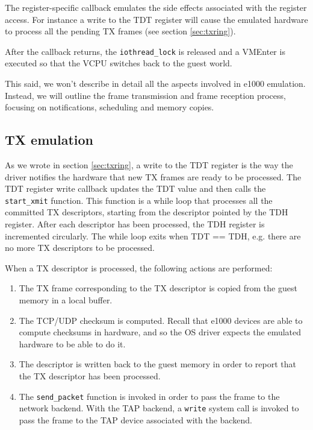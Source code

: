 The register-specific callback emulates the side effects associated with the register access. For instance a write to the TDT
register will cause the emulated hardware to process all the pending TX frames (see section \ref{sec:txring}).

After the callback returns, the \texttt{iothread\_lock} is released and a VMEnter is executed so that the VCPU switches back to the 
guest world.

\vspace{0.5cm}

This said, we won't describe in detail all the aspects involved in e1000 emulation. Instead, we will outline the frame
transmission and frame reception process, focusing on notifications, scheduling and memory copies.


\subsection{TX emulation}
As we wrote in section \ref{sec:txring}, a write to the TDT register is the way the driver notifies the hardware that new TX frames 
are ready to be processed.
The TDT register write callback updates the TDT value and then calls the \texttt{start\_xmit} function. This function is a while
loop that processes all the committed TX descriptors, starting from the descriptor pointed by the TDH register. After each
descriptor has been processed, the TDH register is incremented circularly. The while loop exits when TDT == TDH, e.g. there
are no more TX descriptors to be processed.

When a TX descriptor is processed, the following actions are performed:
\begin{enumerate}
    \item The TX frame corresponding to the TX descriptor is copied from the guest memory in a local buffer.
    \item The TCP/UDP checksum is computed. Recall that e1000 devices are able to compute checksums in hardware, and so the OS 
	  driver expects the emulated hardware to be able to do it.
    \item The descriptor is written back to the guest memory in order to report that the TX descriptor has been processed.
    \item The \texttt{send\_packet} function is invoked in order to pass the frame to the network backend. With the TAP backend,
	  a \texttt{write} system call is invoked to pass the frame to the TAP device associated with the backend.
\end{enumerate}

